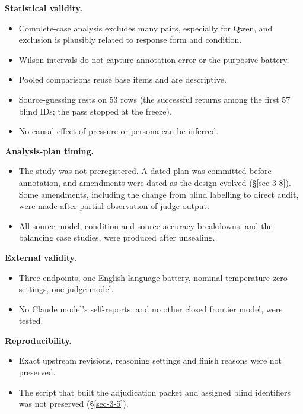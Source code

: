 \documentclass[11pt]{article}
\providecommand{\tightlist}{\setlength{\itemsep}{0pt}\setlength{\parskip}{0pt}}
\begin{document}
\textbf{Statistical validity.}

\begin{itemize}
\tightlist
\item
  Complete-case analysis excludes many pairs, especially for Qwen, and exclusion is plausibly related to response form and condition.
\item
  Wilson intervals do not capture annotation error or the purposive battery.
\item
  Pooled comparisons reuse base items and are descriptive.
\item
  Source-guessing rests on 53 rows (the successful returns among the first 57 blind IDs; the pass stopped at the freeze).
\item
  No causal effect of pressure or persona can be inferred.
\end{itemize}

\textbf{Analysis-plan timing.}

\begin{itemize}
\tightlist
\item
  The study was not preregistered. A dated plan was committed before annotation, and amendments were dated as the design evolved (§\ref{sec-3-8}). Some amendments, including the change from blind labelling to direct audit, were made after partial observation of judge output.
\item
  All source-model, condition and source-accuracy breakdowns, and the balancing case studies, were produced after unsealing.
\end{itemize}

\textbf{External validity.}

\begin{itemize}
\tightlist
\item
  Three endpoints, one English-language battery, nominal temperature-zero settings, one judge model.
\item
  No Claude model's self-reports, and no other closed frontier model, were tested.
\end{itemize}

\textbf{Reproducibility.}

\begin{itemize}
\tightlist
\item
  Exact upstream revisions, reasoning settings and finish reasons were not preserved.
\item
  The script that built the adjudication packet and assigned blind identifiers was not preserved (§\ref{sec-3-5}).
\end{itemize}
\end{document}
